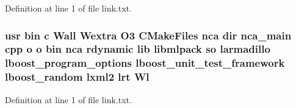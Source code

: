 Definition at line 1 of file link.\-txt.

\subsubsection[{Wl}]{\setlength{\rightskip}{0pt plus 5cm}usr bin c Wall Wextra O3 C\-Make\-Files nca dir nca\-\_\-main cpp o o bin nca rdynamic lib libmlpack so larmadillo lboost\-\_\-program\-\_\-options lboost\-\_\-unit\-\_\-test\-\_\-framework lboost\-\_\-random lxml2 lrt Wl}\label{methods_2nca_2CMakeFiles_2nca_8dir_2link_8txt_a8082a1c1e54af77333f49154c1c51909}


Definition at line 1 of file link.\-txt.

